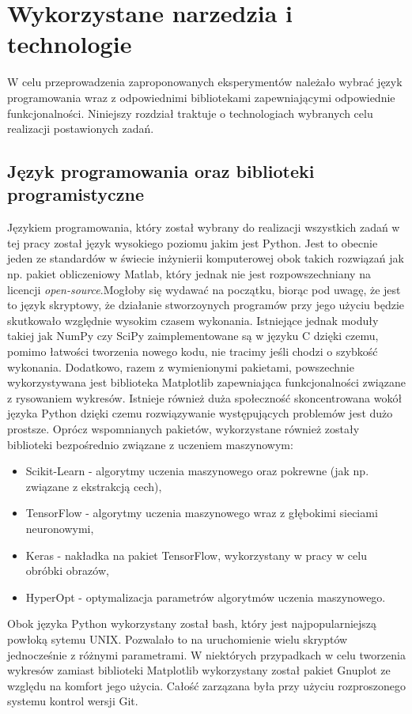 \section{Wykorzystane narzedzia i technologie} \label{tools}
W celu przeprowadzenia zaproponowanych eksperymentów należało wybrać język programowania wraz z odpowiednimi bibliotekami zapewniającymi odpowiednie funkcjonalności. Niniejszy rozdział traktuje o technologiach wybranych celu realizacji postawionych zadań.
\subsection{Język programowania oraz biblioteki programistyczne}
Językiem programowania, który został wybrany do realizacji wszystkich zadań w tej pracy został język wysokiego poziomu jakim jest Python. Jest to obecnie jeden ze standardów w świecie inżynierii komputerowej obok takich rozwiązań jak np. pakiet obliczeniowy Matlab, który jednak nie jest rozpowszechniany na licencji \textit{open-source}.Mogłoby się wydawać na początku, biorąc pod uwagę, że jest to język skryptowy, że działanie stworzoynych programów przy jego użyciu będzie skutkowało względnie wysokim czasem wykonania. Istniejące jednak moduły takiej jak NumPy czy SciPy\cite{scipy} zaimplementowane są w języku C dzięki czemu, pomimo łatwości tworzenia nowego kodu, nie tracimy jeśli chodzi o szybkość wykonania. Dodatkowo, razem z wymienionymi pakietami, powszechnie wykorzystywana jest biblioteka Matplotlib\cite{matplotlib} zapewniająca funkcjonalności związane z rysowaniem wykresów. Istnieje również duża społeczność skoncentrowana wokół języka Python dzięki czemu rozwiązywanie występujących problemów jest dużo prostsze. Oprócz wspomnianych pakietów, wykorzystane również zostały biblioteki bezpośrednio związane z uczeniem maszynowym:
\begin{itemize}
\item Scikit-Learn\cite{scikit} - algorytmy uczenia maszynowego oraz pokrewne (jak np. związane z ekstrakcją cech),
\item TensorFlow\cite{tensorflow} - algorytmy uczenia maszynowego wraz z głębokimi sieciami neuronowymi,
\item Keras\cite{keras} - nakładka na pakiet TensorFlow, wykorzystany w pracy w celu obróbki obrazów,
\item HyperOpt\cite{hyperopt} - optymalizacja parametrów algorytmów uczenia maszynowego.
\end{itemize}
Obok języka Python wykorzystany został bash, który jest najpopularniejszą powłoką sytemu UNIX. Pozwalało to na uruchomienie wielu skryptów jednocześnie z różnymi parametrami. W niektórych przypadkach w celu tworzenia wykresów zamiast biblioteki Matplotlib wykorzystany został pakiet Gnuplot ze względu na komfort jego użycia. Całość zarzązana była przy użyciu rozproszonego systemu kontrol wersji Git.

